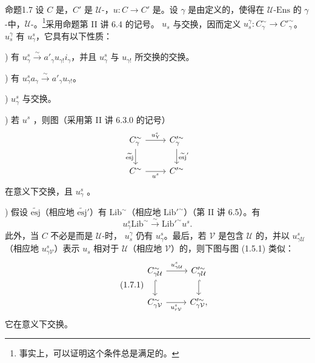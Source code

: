 \begin{SGAresult}{命题}{1.7}
设 $C$ 是，$C'$ 是 $\mathcal U$-，$u:C\to C'$ 是。设 $\gamma$ 是由定义的，使得在 $\mathcal U\text{-}\mathrm{Ens}$ 的 $\gamma$-中，$\mathcal U$-。\footnote{事实上，可以证明这个条件总是满足的。}采用命题第 II 讲 6.4 的记号。 $u_s$ 与交换，因而定义 $u_s^\gamma:C^{\sim}_\gamma\to C'^{\sim}_\gamma$。 $u_s^\gamma$ 有 $u^s_\gamma$，它具有以下性质：

) 有 $u^s_\gamma\xrightarrow{\sim}a'_\gamma u_{\gamma!}i_\gamma$，并且 $u^s_\gamma$ 与 $u_{\gamma!}$ 所交换的交换。

) 有 $u^s_\gamma a_\gamma\xrightarrow{\sim}a'_\gamma u_{\gamma!}$。

)  $u^s_\gamma$ 与交换。

) 若 $u^s$ ，则图（采用第 II 讲 6.3.0 的记号）
\[
\begin{tikzcd}
 C^{\sim}_\gamma\arrow[r,"u^s_{\mathrm Y}"]\arrow[d,"\widetilde{\mathrm{esj}}"']&C'^{\sim}_\gamma\arrow[d,"\widetilde{\mathrm{esj}}'"]\\
 C^{\sim}\arrow[r,"u^s"']&C'^{\sim}
\end{tikzcd}
\]
在意义下交换，且 $u^s_\gamma$ 。

) 假设 $\widetilde{\mathrm{esj}}$（相应地 $\widetilde{\mathrm{esj}}'$）有 $\mathrm{Lib}^{\sim}$（相应地 $\mathrm{Lib}'^{\sim}$）（第 II 讲 6.5）。有
\[
 u^s_\gamma\mathrm{Lib}^{\sim}\xrightarrow{\sim}\mathrm{Lib}'^{\sim}u^s.
\]
此外，当 $C$ 不必是而是 $\mathcal U$-时， $u_s^\gamma$ 仍有 $u^s_\gamma$。最后，若 $\mathcal V$ 是包含 $\mathcal U$ 的，并以 $u^s_{\gamma\mathcal U}$（相应地 $u^s_{\gamma\mathcal V}$）表示 $u_s$ 相对于 $\mathcal U$（相应地 $\mathcal V$）的，则下图与图 (1.5.1) 类似：
\begin{equation}\tag{1.7.1}
\begin{tikzcd}
 C^{\sim}_{\gamma\mathcal U}\arrow[r,"u^s_{\gamma\mathcal U}"]\arrow[d,hook]&C'^{\sim}_{\gamma\mathcal U}\arrow[d,hook]\\
 C^{\sim}_{\gamma\mathcal V}\arrow[r,"u^s_{r\mathcal V}"']&C'^{\sim}_{\gamma\mathcal V},
\end{tikzcd}
\end{equation}
它在意义下交换。
\end{SGAresult}
